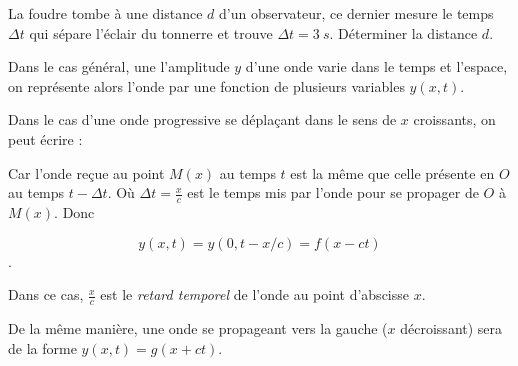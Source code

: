 \documentclass[MPSI]{cours}
\begin{document}
\begin{application}
La foudre tombe à une distance $d$ d'un observateur, ce dernier mesure le temps $\Delta t$ qui sépare l'éclair du tonnerre et trouve $\Delta t=\SI{3}{s}$. Déterminer la distance $d$. 
\end{application}

Dans le cas général, une l'amplitude $y$ d'une onde varie dans le temps et l'espace, on représente alors l'onde par une fonction de plusieurs variables $y(x, t)$. 

Dans le cas d'une onde progressive se déplaçant dans le sens de $x$ croissants, on peut écrire :
\begin{center}
\newcommand\mytikzmark[2]{%
  \tikz[remember picture,baseline=(#1.base)]{\node(#1)[inner sep=0pt,outer sep=0pt]{#2};}%
}
\end{center}

Car l'onde reçue au point $M(x)$ au temps $t$ est la même que celle présente en $O$ au temps $t-\Delta t$. Où $\Delta t = \frac{x}{c}$ est le temps mis par l'onde pour se propager de $O$ à $M(x)$. Donc 

\begin{equation}
  y(x, t) = y(0, t-x/c) = f(x-ct)
\end{equation}.    

Dans ce cas, $\frac{x}{c}$ est le \emph{retard temporel} de l'onde au point d'abscisse $x$. 

De la même manière, une onde se propageant vers la gauche ($x$ décroissant) sera de la forme $y(x, t) = g(x+ct)$.  
\end{document}

